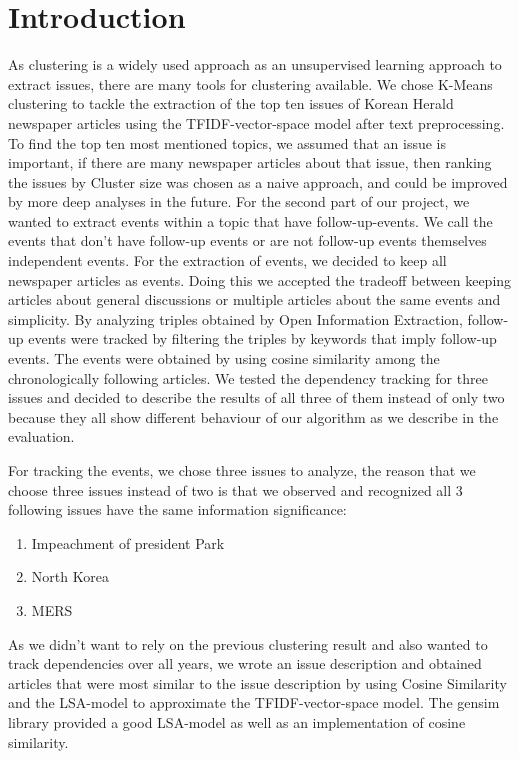 \section{Introduction}
As clustering is a widely used approach as an unsupervised learning approach to extract issues, there are many tools for clustering available. We chose K-Means clustering to tackle the extraction of the top ten issues of Korean Herald newspaper articles  using the TFIDF-vector-space model after text preprocessing.
To find the top ten most mentioned topics, we assumed that an issue is important, if there are many newspaper articles about that issue, then ranking the issues by Cluster size was chosen as a naive approach, and could be improved by more deep analyses in the future.
For the second part of our project, we wanted to extract events within a topic that have follow-up-events. We call the events that don't have follow-up events or are not follow-up events themselves independent events. For the extraction of events, we decided to keep all newspaper articles as events. Doing this we accepted the tradeoff between keeping articles about general discussions or multiple articles about the same events and simplicity. By analyzing triples obtained by Open Information Extraction, follow-up events were tracked by filtering the triples by keywords that imply follow-up events. The events were obtained by using cosine similarity among the chronologically following articles. 
We tested the dependency tracking for three issues and decided to describe the results of all three of them instead of only two because they all show different behaviour of our algorithm as we describe in the evaluation.

For tracking the events, we chose three issues to analyze, the reason that we choose three issues instead of two is that we observed and recognized all 3 following issues have the same information significance:
\begin{enumerate}
	\item{Impeachment of president Park}
	\item{North Korea}
	\item{MERS}
\end{enumerate}
As we didn't want to rely on the previous clustering result and also wanted to track dependencies over all years, we wrote an issue description and obtained articles that were most similar to the issue description by using Cosine Similarity and the LSA-model to approximate the TFIDF-vector-space model. The gensim library provided a good LSA-model as well as an implementation of cosine similarity.